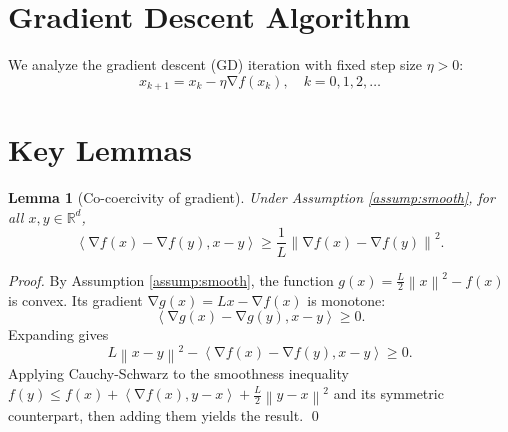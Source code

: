 \documentclass[11pt]{article}
\newtheorem{lemma}{Lemma}
\DeclareMathOperator{\grad}{\nabla}
\newcommand{\norm}[1]{\left\|#1\right\|}
\newcommand{\inner}[2]{\left\langle #1, #2 \right\rangle}
\newcommand{\R}{\mathbb{R}}
\begin{document}
\section{Gradient Descent Algorithm}

We analyze the gradient descent (GD) iteration with fixed step size $\eta > 0$:
\begin{equation}
    x_{k+1} = x_k - \eta \grad f(x_k), \quad k = 0, 1, 2, \dots
    \label{eq:gd}
\end{equation}

\section{Key Lemmas}

\begin{lemma}[Co-coercivity of gradient] \label{lem:cocoercivity}
    Under Assumption \ref{assump:smooth}, for all $x, y \in \R^d$,
    \begin{equation}
        \inner{\grad f(x) - \grad f(y)}{x - y} \ge \frac{1}{L} \norm{\grad f(x) - \grad f(y)}^2.
        \label{eq:cocoercivity}
    \end{equation}
\end{lemma}
\begin{proof}
    By Assumption \ref{assump:smooth}, the function $g(x) = \frac{L}{2}\norm{x}^2 - f(x)$ is convex. Its gradient $\grad g(x) = Lx - \grad f(x)$ is monotone:
    \begin{equation}
        \inner{\grad g(x) - \grad g(y)}{x - y} \ge 0.
    \end{equation}
    Expanding gives
    \begin{equation}
        L\norm{x - y}^2 - \inner{\grad f(x) - \grad f(y)}{x - y} \ge 0.
    \end{equation}
    Applying Cauchy-Schwarz to the smoothness inequality $f(y) \le f(x) + \inner{\grad f(x)}{y-x} + \frac{L}{2}\norm{y-x}^2$ and its symmetric counterpart, then adding them yields the result. \qed
\end{proof}
\end{document}
